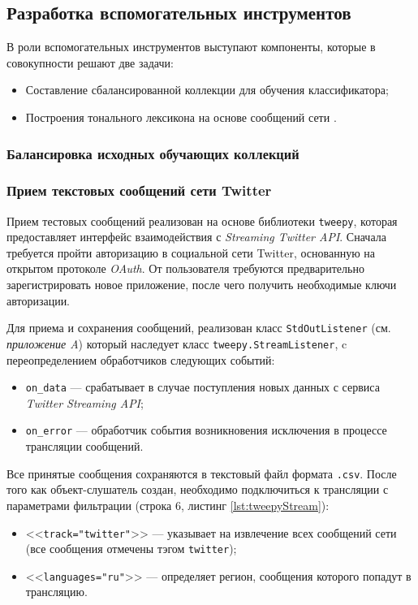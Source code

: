 \subsection{Разработка вспомогательных инструментов}
В роли вспомогательных инструментов выступают компоненты, которые в совокупности
решают две задачи:
\begin{itemize}
    \item Составление сбалансированной коллекции для обучения классификатора;
    \item Построения тонального лексикона на основе сообщений сети \twitter.
\end{itemize}

    \subsubsection{Балансировка исходных обучающих коллекций}


    \subsubsection{Прием текстовых сообщений сети Twitter}
    Прием тестовых сообщений реализован на основе библиотеки {\tt tweepy}, которая
    предоставляет интерфейс взаимодействия с {\it Streaming Twitter API}.
    Сначала требуется пройти авторизацию в социальной сети Twitter, основанную
    на открытом протоколе {\it OAuth}.
    От пользователя требуются предварительно зарегистрировать новое приложение,
    после чего получить необходимые ключи авторизации.

    Для приема и сохранения сообщений, реализован класс {\tt StdOutListener}
    (см. {\it приложение A}) который  наследует класс {\tt tweepy.StreamListener},
    c переопределением обработчиков следующих событий:
    \begin{itemize}
        \item {\tt on\_data} --- срабатывает в случае поступления новых данных
        с сервиса {\it Twitter Streaming API};
        \item {\tt on\_error} --- обработчик события возникновения исключения
        в процессе трансляции сообщений.
    \end{itemize}

    Все принятые сообщения сохраняются в текстовый файл формата {\tt .csv}.
    После того как объект-слушатель создан, необходимо подключиться к трансляции
    с параметрами фильтрации (строка 6, листинг \ref{lst:tweepyStream}):
    \begin{itemize}
        \item <<{\tt track=\lbrack"twitter"\rbrack}>> --- указывает на
        извлечение всех сообщений сети (все сообщения отмечены тэгом
        {\tt twitter});
        \item <<{\tt languages=\lbrack"ru"\rbrack}>> --- определяет регион,
        сообщения которого попадут в трансляцию.
    \end{itemize}

